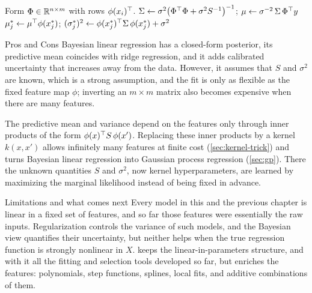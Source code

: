 \begin{algorithm}[H]
\caption{Bayesian Linear Regression}\label{alg:blr}
\begin{algorithmic}[1]
\State Form $\Phi\in\mathbb{R}^{n\times m}$ with rows $\phi(x_i)^{\top}$.
\State $\Sigma\gets\sigma^2\big(\Phi^{\top}\Phi+\sigma^2S^{-1}\big)^{-1}$; \quad $\mu\gets\sigma^{-2}\,\Sigma\,\Phi^{\top} y$ 
  \State $\mu_j^*\gets\mu^{\top}\phi(x_j^*)$; \quad $(\sigma_j^*)^2\gets\phi(x_j^*)^{\top}\Sigma\,\phi(x_j^*)+\sigma^2$ 
\EndFor
{}
\end{algorithmic}
\end{algorithm}

\begin{notebox}{Pros and Cons}
Bayesian linear regression has a closed-form posterior, its predictive mean coincides with ridge regression, and it adds calibrated uncertainty that increases away from the data. However, it assumes that $S$ and $\sigma^2$ are known, which is a strong assumption, and the fit is only as flexible as the fixed feature map $\phi$; inverting an $m\times m$ matrix also becomes expensive when there are many features.
\end{notebox}

\begin{remark}
The predictive mean and variance depend on the features only through inner products of the form $\phi(x)^{\top} S\,\phi(x')$. Replacing these inner products by a kernel $k(x,x')$ allows infinitely many features at finite cost (\cref{sec:kernel-trick}) and turns Bayesian linear regression into Gaussian process regression (\cref{sec:gp}). There the unknown quantities $S$ and $\sigma^2$, now kernel hyperparameters, are learned by maximizing the marginal likelihood instead of being fixed in advance.
\end{remark}

\begin{notebox}{Limitations and what comes next}
Every model in this and the previous chapter is linear in a fixed set of features, and so far those features were essentially the raw inputs. Regularization controls the variance of such models, and the Bayesian view quantifies their uncertainty, but neither helps when the true regression function is strongly nonlinear in $X$.  keeps the linear-in-parameters structure, and with it all the fitting and selection tools developed so far, but enriches the features: polynomials, step functions, splines, local fits, and additive combinations of them.
\end{notebox}
